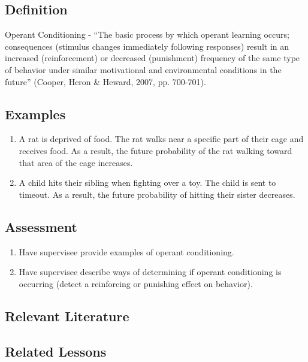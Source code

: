 \subsection{Definition}
Operant Conditioning - ``The basic process by which operant learning occurs; consequences (stimulus changes immediately following responses) result in an increased (reinforcement) or decreased (punishment) frequency of the same type of behavior under similar motivational and environmental conditions in the future'' (Cooper, Heron \& Heward, 2007, pp. 700-701).
%
\subsection{Examples}
\begin{enumerate}
\item   A rat is deprived of food. The rat walks near a specific part of their cage and receives food. As a result, the future probability of the rat walking toward that area of the cage increases.
\item A child hits their sibling when fighting over a toy. The child is sent to timeout. As a result, the future probability of hitting their sister decreases.
%
\end{enumerate}
%
\subsection{Assessment}
\begin{enumerate}
\item Have supervisee provide examples of operant conditioning.
\item Have supervisee describe ways of determining if operant conditioning is occurring (detect a reinforcing or punishing effect on behavior).
%
\end{enumerate}
%
\subsection{Relevant Literature}
\begin{refsection}
\nocite{cooper2007applied,
        mcallister1969application}
\printbibliography[heading=none]
\end{refsection}
%
\subsection{Related Lessons}
\fourFKFifteen{}\\
\fourFKThirtyOne{}\\
\fourFKThirtyThree{}\\
%
\clearpage \section{\fourFKSixteen{}}
